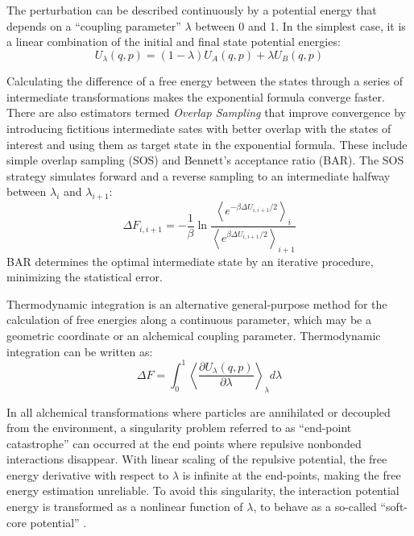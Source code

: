  The perturbation can be described continuously by a potential energy that depends on a “coupling parameter” $\lambda$ between 0 and 1.
 In the simplest case, it is a linear combination of the initial and final state potential energies:
 \begin{equation}\label{eq:U_lambda}
 U_\lambda(q, p)=(1-\lambda)U_A(q, p)+\lambda U_B(q, p)
 \end{equation}

 Calculating the difference of a free energy between the states through a series of intermediate transformations makes the exponential formula converge faster.
 There are also estimators termed \textit{Overlap Sampling} that improve convergence by introducing fictitious intermediate sates with better overlap with the states of interest and using them as target state in the exponential formula.
 These include simple overlap sampling (SOS) and Bennett's acceptance ratio (BAR). The SOS strategy simulates forward and a reverse sampling to an intermediate halfway between $\lambda_i$ and $\lambda_{i+1}$:\cite{Lu2004}
 \begin{equation}\label{eq:SOS}
 \Delta F_{i,i+1}=-\frac{1}{\beta}\ln{\frac
 {\left\langle e^{-\beta\Delta U_{i,i+1}/2} \right\rangle_{i}}
 {\left\langle e^{\beta\Delta U_{i,i+1}/2} \right\rangle_{i+1}}
 }
 \end{equation}
 BAR determines the optimal intermediate state by an iterative procedure, minimizing the statistical error\cite{Bennett1976,Lu2004,Lu2004a}.


 Thermodynamic integration is an alternative general-purpose method for the calculation of free energies along a continuous parameter, which may be a geometric coordinate or an alchemical coupling parameter. \cite{Mitchell1991,VanGunsteren2002,Jorge2010} 
 Thermodynamic integration can be written as:
 \begin{equation}\label{eq:TI}
 \Delta F=\int_0^1\left\langle\frac{\partial U_\lambda(q,p)}{\partial\lambda}\right\rangle_\lambda d\lambda
 \end{equation}

 In all alchemical transformations where particles are annihilated or decoupled from the environment, a singularity problem referred to as “end-point catastrophe” can occurred at the end points where repulsive nonbonded interactions disappear.
 With linear scaling of the repulsive potential, the free energy derivative with respect to $\lambda$ is infinite at the end-points, making the free energy estimation unreliable.
 To avoid this singularity, the interaction potential energy is transformed as a nonlinear function of $\lambda$, to behave as a so-called “soft-core potential” \cite{Beutler1994,Zacharias1994}.

